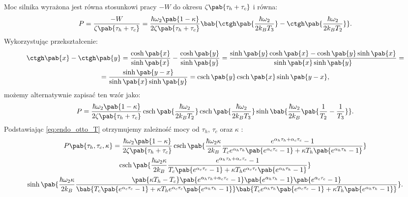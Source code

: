 Moc silnika wyrażona jest równa stosunkowi pracy \(- W\) do okresu \(\zeta\pab{\tau_h + \tau_c}\) i równa:
\begin{equation}
	P = \frac{-W}{\zeta\pab{\tau_h + \tau_c}} = \frac{\hbar\omega_2\pab{1-\kappa}}{2\zeta\pab{\tau_h + \tau_c}} \bab{\ctgh\pab{\frac{\hbar\omega_2}{2k_B T_3}} - \ctgh\pab{\frac{\hbar\omega_2}{2k_B T_2}}}.
\end{equation}
Wykorzystując przekształcenie:
\begin{multline}
	\ctgh\pab{x} - \ctgh\pab{y} =
	\frac{\cosh\pab{x}}{\sinh\pab{x}} - \frac{\cosh\pab{y}}{\sinh\pab{y}} =
	\frac{\sinh\pab{y}\cosh\pab{x} - \cosh\pab{y}\sinh\pab{x}}{\sinh\pab{x}\sinh\pab{y}} = \\ =
	\frac{\sinh\pab{y-x}}{\sinh\pab{x}\sinh\pab{y}} =
	\csch\pab{y}\csch\pab{x}\sinh\pab{y-x},
\end{multline}
możemy alternatywnie zapisać ten wzór jako:
\begin{equation}
	P = \frac{\hbar\omega_2\pab{1-\kappa}}{2\zeta\pab{\tau_h + \tau_c}} \csch\pab{\frac{\hbar\omega_2}{2k_B T_2}} \csch\pab{\frac{\hbar\omega_2}{2k_B T_3}} \sinh\bab{\frac{\hbar\omega_2}{2k_B}\pab{\inv{T_2}-\inv{T_3}}}.
\end{equation}
Podstawiając \eqref{eq:endo_otto_T} otrzymujemy zależność mocy od \(\tau_h\), \(\tau_c\) oraz \(\kappa\) \cite{endo_otto}:
\begin{multline}
	P\pab{\tau_h,\tau_c,\kappa} =
	\frac{\hbar\omega_2\pab{1-\kappa}}{2\zeta\pab{\tau_h + \tau_c}}
	\csch\pab{\frac{\hbar\omega_2 \kappa}{2k_B}
	\frac{
		e^{\alpha_h \tau_h + \alpha_c \tau_c} - 1
	}{
		T_c e^{\alpha_h \tau_h} \pab{e^{\alpha_c \tau_c} - 1} + \kappa T_h \pab{e^{\alpha_h \tau_h} - 1}
	}} \\
	\csch\pab{\frac{\hbar\omega_2 \kappa}{2k_B}
	\frac{
		e^{\alpha_h \tau_h + \alpha_c \tau_c} - 1
	}{
		T_c \pab{e^{\alpha_c \tau_c} - 1} + \kappa T_h e^{\alpha_c \tau_c} \pab{e^{\alpha_h \tau_h} - 1}
	}} \\
	\sinh\pab{\frac{\hbar\omega_2 \kappa}{2k_B}
	\frac{
	\pab{\kappa T_h - T_c}\pab{e^{\alpha_h \tau_h + \alpha_c \tau_c} - 1}\pab{e^{\alpha_h \tau_h} - 1}\pab{e^{\alpha_c \tau_c} - 1}
	}{
	\bab{T_c \pab{e^{\alpha_c \tau_c} - 1} + \kappa T_h e^{\alpha_c \tau_c} \pab{e^{\alpha_h \tau_h} - 1}}
	\bab{T_c e^{\alpha_h \tau_h} \pab{e^{\alpha_c \tau_c} - 1} + \kappa T_h \pab{e^{\alpha_h \tau_h} - 1}}
	}}.
\end{multline}
